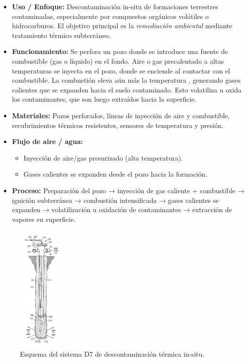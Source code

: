 \documentclass[12pt]{article}
\begin{document}
\begin{itemize}
    \item \textbf{Uso / Enfoque:} Descontaminación in-situ de formaciones terrestres contaminadas, especialmente por compuestos orgánicos volátiles o hidrocarburos. El objetivo principal es la \textit{remediación ambiental} mediante tratamiento térmico subterráneo.

    \item \textbf{Funcionamiento:} Se perfora un pozo donde se introduce una fuente de combustible (gas o líquido) en el fondo. Aire o gas precalentado a altas temperaturas  se inyecta en el pozo, donde se enciende al contactar con el combustible. La combustión eleva aún más la temperatura , generando gases calientes que se expanden hacia el suelo contaminado. Esto volatiliza u oxida los contaminantes, que son luego extraídos hacia la superficie.

    \item \textbf{Materiales:} Pozos perforados, líneas de inyección de aire y combustible, recubrimientos térmicos resistentes, sensores de temperatura y presión.

    \item \textbf{Flujo de aire / agua:} 
    \begin{itemize}
        \item Inyección de aire/gas presurizado (alta temperatura).
        \item Gases calientes se expanden desde el pozo hacia la formación.
    \end{itemize}

    \item \textbf{Proceso:} Preparación del pozo → inyección de gas caliente + combustible → ignición subterránea → combustión intensificada → gases calientes se expanden → volatilización u oxidación de contaminantes → extracción de vapores en superficie.
\end{itemize}

\begin{figure}[H]
\centering
\includegraphics[width=0.2\textwidth]{images/d7_sperry_sun.png}
\caption{Esquema del sistema D7 de descontaminación térmica in-situ.}
\end{figure}
\end{document}

